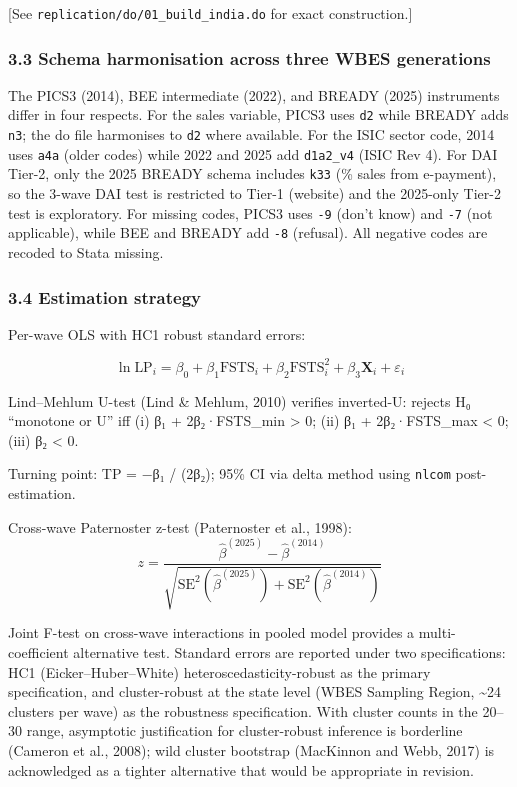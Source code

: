 \documentclass[
  12pt,a4paper]{article}
\begin{document}
{[}See \texttt{replication/do/01\_build\_india.do} for exact
construction.{]}

\hypertarget{schema-harmonisation-across-three-wbes-generations}{%
\subsubsection{3.3 Schema harmonisation across three WBES
generations}\label{schema-harmonisation-across-three-wbes-generations}}

The PICS3 (2014), BEE intermediate (2022), and BREADY (2025) instruments
differ in four respects. For the sales variable, PICS3 uses \texttt{d2}
while BREADY adds \texttt{n3}; the do file harmonises to \texttt{d2}
where available. For the ISIC sector code, 2014 uses \texttt{a4a} (older
codes) while 2022 and 2025 add \texttt{d1a2\_v4} (ISIC Rev 4). For DAI
Tier-2, only the 2025 BREADY schema includes \texttt{k33} (\% sales from
e-payment), so the 3-wave DAI test is restricted to Tier-1 (website) and
the 2025-only Tier-2 test is exploratory. For missing codes, PICS3 uses
\texttt{-9} (don't know) and \texttt{-7} (not applicable), while BEE and
BREADY add \texttt{-8} (refusal). All negative codes are recoded to
Stata missing.

\hypertarget{estimation-strategy}{%
\subsubsection{3.4 Estimation strategy}\label{estimation-strategy}}

Per-wave OLS with HC1 robust standard errors:

\[\ln \text{LP}_i = \beta_0 + \beta_1 \text{FSTS}_i + \beta_2 \text{FSTS}^2_i + \beta_3 \mathbf{X}_i + \varepsilon_i\]

Lind--Mehlum U-test (Lind \& Mehlum, 2010) verifies inverted-U: rejects
H₀ ``monotone or U'' iff (i) β₁ + 2β₂·FSTS\_min \textgreater{} 0; (ii)
β₁ + 2β₂·FSTS\_max \textless{} 0; (iii) β₂ \textless{} 0.

Turning point: TP = −β₁ / (2β₂); 95\% CI via delta method using
\texttt{nlcom} post-estimation.

Cross-wave Paternoster z-test (Paternoster et al., 1998):
\[z = \frac{\hat\beta^{(2025)} - \hat\beta^{(2014)}}{\sqrt{\text{SE}^2(\hat\beta^{(2025)}) + \text{SE}^2(\hat\beta^{(2014)})}}\]

Joint F-test on cross-wave interactions in pooled model provides a
multi-coefficient alternative test. Standard errors are reported under
two specifications: HC1 (Eicker--Huber--White) heteroscedasticity-robust
as the primary specification, and cluster-robust at the state level
(WBES Sampling Region, \textasciitilde24 clusters per wave) as the
robustness specification. With cluster counts in the 20--30 range,
asymptotic justification for cluster-robust inference is borderline
(Cameron et al., 2008); wild cluster bootstrap (MacKinnon and Webb,
2017) is acknowledged as a tighter alternative that would be appropriate
in revision.
\end{document}
